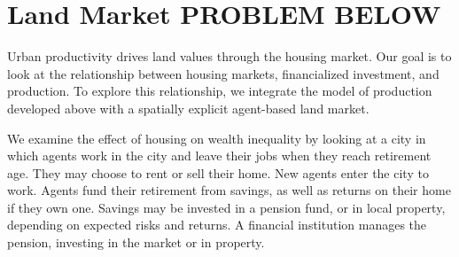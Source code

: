 \section{Land Market PROBLEM BELOW}

Urban productivity %
drives land values through the housing market.%
Our goal is to look at the relationship between housing markets, financialized investment, and production. %
To explore this relationship, we integrate the model of production developed above with a spatially explicit agent-based land market. %

We examine the effect of housing on wealth inequality by looking at 
a city in which agents work in the city and leave their jobs when they reach retirement age. They may choose to rent or sell their home. %
New agents enter the city to work. 
Agents fund their retirement from savings, as well as returns on their home if they own one. Savings may be invested in a pension fund, or in local property,  depending on expected risks and returns. %
A financial institution manages the pension, investing in the market or in property.

 

